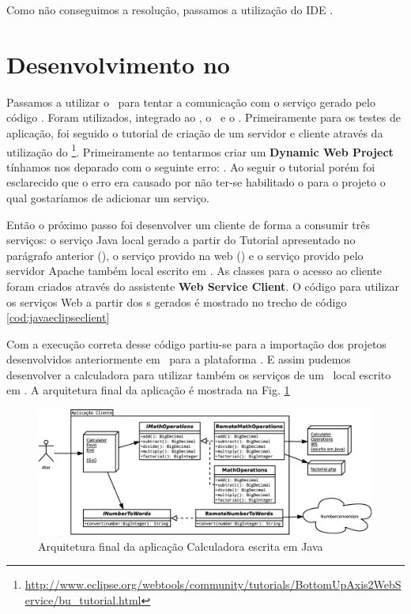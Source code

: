 Como não conseguimos a resolução, passamos a utilização do IDE \Eclipsev.

\section{Desenvolvimento no \Eclipsev}

Passamos a utilizar o \Eclipsev\ para tentar a comunicação com o serviço gerado
pelo código \PHP. Foram utilizados, integrado ao \Eclipse, o \ApacheTomcatv\ e o
\ApacheAxisDoisv. Primeiramente para os testes de aplicação, foi seguido o
tutorial de criação de um servidor e cliente através da utilização do
\ApacheAxisDoisv\footnote{\url{http://www.eclipse.org/webtools/community/tutorials/BottomUpAxis2WebService/bu_tutorial.html}}.
Primeiramente ao tentarmos criar um \textbf{Dynamic Web Project} tínhamos nos
deparado com o seguinte erro: . Ao
seguir o tutorial porém foi esclarecido que o erro era causado por não ter-se
habilitado o   para o projeto o qual
gostaríamos de adicionar um serviço.

Então o próximo passo foi desenvolver um cliente de forma a consumir três
serviços: o serviço Java local gerado a partir do Tutorial apresentado no parágrafo
anterior (), o serviço provido na web ()
e o serviço provido pelo servidor Apache também local escrito em \php. As
classes  para o acesso ao cliente foram criados através do
assistente \textbf{Web Service Client}. O código para utilizar os serviços Web a
partir dos \stub s gerados é mostrado no trecho de código
\ref{cod:javaeclipseclient}

Com a execução correta desse código partiu-se para a importação dos projetos
desenvolvidos anteriormente em \NetBeans\ para a plataforma \Eclipse. E assim
pudemos desenvolver a calculadora para utilizar também os serviços de um
\WebService\ local escrito em \PHP. A arquitetura final da aplicação é mostrada
na Fig. \ref{fig:arquitetura:final} 

\begin{figure}[htb]
  \centering
  \includegraphics[width=\textwidth]{imgs/arquitetura_final}
  \caption{Arquitetura final da aplicação Calculadora escrita em Java}
  \label{fig:arquitetura:final}
\end{figure}

